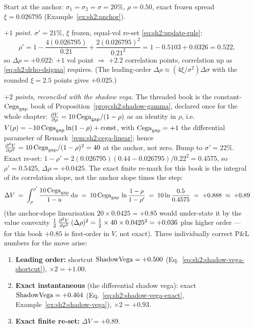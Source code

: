 \begin{example}
\label{ex:sh2:update}
Start at the anchor: $\sigma_1 = \sigma_2 = \sigma = 20\%$, $\rho = 0.50$,
exact frozen spread $\xi = 0.026795$ (Example~\ref{ex:sh2:anchor}).

\emph{$+1$ point.} $\sigma' = 21\%$, $\xi$ frozen, equal-vol re-set
\eqref{eq:sh2:update-rule}:
\[
  \rho' = 1 - \frac{4(0.026795)}{0.21} + \frac{2(0.026795)^2}{0.21^2}
        = 1 - 0.5103 + 0.0326 = 0.522,
\]
so $\Delta\rho = +0.022$: $+1$ vol point $\Rightarrow$ $+2.2$ correlation
points, correlation up as \eqref{eq:sh2:drho-dsigma} requires. (The
leading-order $\Delta\rho \approx (4\xi/\sigma^2)\Delta\sigma$ with the
rounded $\xi = 2.5$ points gives $+0.025$.)

\emph{$+2$ points, reconciled with the shadow vega.} The threaded book is
the constant-$\mathrm{Cega}_{\mathrm{gap}}$ book of Proposition~\ref{prop:sh2:shadow-gamma},
declared once for the whole chapter:
$\frac{\partial V}{\partial \rho} = 10\,\mathrm{Cega}_{\mathrm{gap}}/(1 - \rho)$ as an identity in $\rho$, i.e.\
$V(\rho) = -10\,\mathrm{Cega}_{\mathrm{gap}} \ln(1 - \rho) + \text{const}$, with
$\mathrm{Cega}_{\mathrm{gap}} = +1$ the differential parameter of
Remark~\ref{rem:sh2:cega-linear}; hence
$\frac{\partial^2 V}{\partial \rho^2} = 10\,\mathrm{Cega}_{\mathrm{gap}}/(1-\rho)^2 = 40$ at the anchor, not zero.
Bump to $\sigma' = 22\%$. Exact re-set:
$1 - \rho' = 2(0.026795)(0.44 - 0.026795)/0.22^2 = 0.4575$, so
$\rho' = 0.5425$, $\Delta\rho = +0.0425$. The exact finite re-mark for
this book is the integral of its correlation slope, not the anchor slope
times the step:
\[
  \Delta V \;=\; \int_{\rho}^{\rho'} \frac{10\,\mathrm{Cega}_{\mathrm{gap}}}{1 - u}\, \mathrm{d} u
  \;=\; 10\,\mathrm{Cega}_{\mathrm{gap}}\, \ln\frac{1 - \rho}{1 - \rho'}
  \;=\; 10 \ln\frac{0.5}{0.4575} \;=\; +0.888 \;\approx\; +0.89
\]
(the anchor-slope linearisation $20 \times 0.0425 = +0.85$ would
under-state it by the value convexity
$\tfrac12\,\frac{\partial^2 V}{\partial \rho^2}\,(\Delta\rho)^2 = \tfrac12 \times 40 \times
0.0425^2 = +0.036$ plus higher order --- for this book $+0.85$ is
first-order in $V$, not exact). Three individually correct P\&L numbers
for the move arise:
\begin{enumerate}[label=(\alph*)]
\item \textbf{Leading order:} shortcut $\mathrm{ShadowVega} = +0.500$
  (Eq.~\eqref{eq:sh2:shadow-vega-shortcut}), $\times 2 = +1.00$.
\item \textbf{Exact instantaneous} (the differential shadow vega): exact
  $\mathrm{ShadowVega} = +0.464$
  (Eq.~\eqref{eq:sh2:shadow-vega-exact},
  Example~\ref{ex:sh2:shadow-vega}), $\times 2 = +0.93$.
\item \textbf{Exact finite re-set:} $\Delta V = +0.89$.

\end{enumerate}
\end{example}
